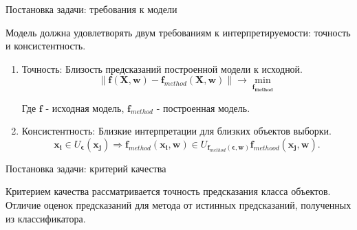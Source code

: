 \documentclass{beamer}
\begin{document}
\begin{frame}{Постановка задачи: требования к модели}

Модель должна удовлетворять двум требованиям к интерпретируемости: $\textbf{точность}$ и $\textbf{консистентность}$.
\begin{enumerate}
   \item{Точность}:
    Близость предсказаний построенной модели к исходной.
	$$\|\mathbf{f}(\mathbf{X}, \mathbf{w}) - \mathbf{f}_{method}(\mathbf{X}, \mathbf{w})\| \to \min_{\mathbf{f_{method}}}$$    

 Где $\mathbf{f}$ - исходная модель, $\mathbf{f}_{method}$ - построенная модель.
    \item{Консистентность}:
    Близкие интерпретации для близких объектов выборки. $$\mathbf{x_i} \in U_\mathbf{\epsilon}(\mathbf{x_j}) \Longrightarrow \mathbf{f}_{method}(\mathbf{x_i}, \mathbf{w}) \in U_{\mathbf{f}_{method}(\mathbf{\epsilon}, \mathbf{w})}\mathbf{f}_{methood}(\mathbf{x_j}, \mathbf{w}).$$
\end{enumerate}
\end{frame}
\begin{frame}{Постановка задачи: критерий качества}

Критерием качества рассматривается точность предсказания класса объектов. Отличие оценок предсказаний для метода от истинных предсказаний, полученных из классификатора.

\end{frame}
\end{document}
